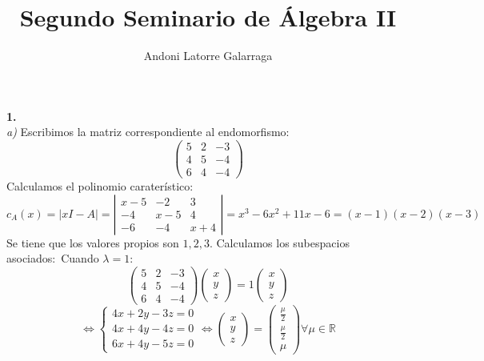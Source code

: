 \documentclass{article}
\title{Segundo Seminario de Álgebra II}
\author{Andoni Latorre Galarraga}
\date{}
\begin{document}
\maketitle
\noindent \textbf{1.}\\
%
%
%
%
\textit{a)}
Escribimos la matriz correspondiente al endomorfismo:\\
$$
\left( \begin{array}{ccc}
    5 & 2 & -3\\
    4 & 5 & -4\\
    6 & 4 & -4
\end{array} \right)
$$
Calculamos el polinomio caraterístico:
$$
c_A(x) = |xI-A| = 
\left| \begin{array}{ccc}
    x-5 & -2 & 3\\
    -4 & x-5 & 4\\
    -6 & -4 & x+4
\end{array} \right| =
x^3-6x^2+11x-6 = (x-1)(x-2)(x-3)
$$
Se tiene que los valores propios son $1,2,3$. Calculamos los subespacios asociados:\
Cuando $\lambda = 1$:
$$
\left( \begin{array}{ccc}
    5 & 2 & -3\\
    4 & 5 & -4\\
    6 & 4 & -4
\end{array} \right)
\left( \begin{array}{c}
      x \\
      y \\
      z
\end{array} \right) = 1
\left( \begin{array}{c}
      x \\
      y \\
      z
\end{array} \right)
$$
$$
\Leftrightarrow \left\{ \begin{array}{c}
     4x+2y-3z =0  \\
     4x+4y-4z =0  \\
     6x+4y-5z =0
\end{array} \right.
\Leftrightarrow \left( \begin{array}{c}
      x \\
      y \\
      z
\end{array} \right) =
\left( \begin{array}{c}
      \frac{\mu}{2} \\
      \frac{\mu}{2} \\
      \mu
\end{array} \right) \forall \mu \in \mathbb{R}
$$
\end{document}
